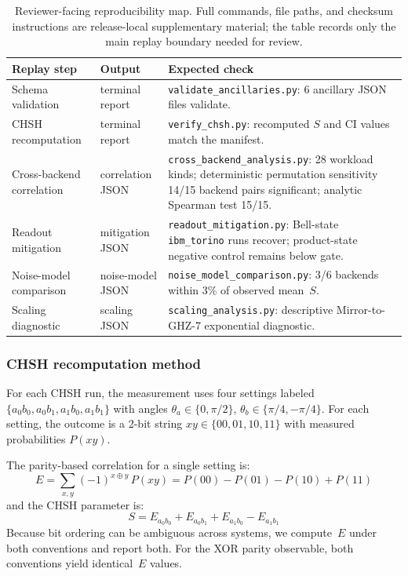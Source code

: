 \documentclass[aps,prxquantum,twocolumn,superscriptaddress,amsmath,amssymb,longbibliography,floatfix]{revtex4-2}
\begin{document}
\begin{table}[t]
\caption{Reviewer-facing reproducibility map. Full commands, file paths, and checksum instructions are release-local supplementary material; the table records only the main replay boundary needed for review.}
\label{tab:replay_map}
\footnotesize
\setlength{\tabcolsep}{4pt}
\begin{ruledtabular}
\begin{tabular}{p{3.8cm}p{3.6cm}p{8.3cm}}
Replay step & Output & Expected check \\
\hline
Schema validation & terminal report & \texttt{validate\_ancillaries.py}: 6 ancillary JSON files validate. \\
CHSH recomputation & terminal report & \texttt{verify\_chsh.py}: recomputed $S$ and CI values match the manifest. \\
Cross-backend correlation & correlation JSON & \texttt{cross\_backend\_analysis.py}: 28 workload kinds; deterministic permutation sensitivity 14/15 backend pairs significant; analytic Spearman test 15/15. \\
Readout mitigation & mitigation JSON & \texttt{readout\_mitigation.py}: Bell-state \texttt{ibm\_torino} runs recover; product-state negative control remains below gate. \\
Noise-model comparison & noise-model JSON & \texttt{noise\_model\_comparison.py}: 3/6 backends within 3\% of observed mean~$S$. \\
Scaling diagnostic & scaling JSON & \texttt{scaling\_analysis.py}: descriptive Mirror-to-GHZ-7 exponential diagnostic. \\
\end{tabular}
\end{ruledtabular}
\end{table}

\subsubsection{CHSH recomputation method}
\label{sec:chsh_method}

For each CHSH run, the measurement uses four settings labeled $\{a_0b_0, a_0b_1, a_1b_0, a_1b_1\}$ with angles $\theta_a \in \{0, \pi/2\}$, $\theta_b \in \{\pi/4, -\pi/4\}$. For each setting, the outcome is a 2-bit string $xy \in \{00, 01, 10, 11\}$ with measured probabilities $P(xy)$.

The parity-based correlation for a single setting is:
\begin{equation}
  E = \sum_{x,y} (-1)^{x \oplus y} \, P(xy) = P(00) - P(01) - P(10) + P(11)
  \label{eq:corr}
\end{equation}
and the CHSH parameter is:
\begin{equation}
  S = E_{a_0b_0} + E_{a_0b_1} + E_{a_1b_0} - E_{a_1b_1}
  \label{eq:chsh}
\end{equation}
Because bit ordering can be ambiguous across systems, we compute~$E$ under both conventions and report both. For the XOR parity observable, both conventions yield identical~$E$ values.
\end{document}
